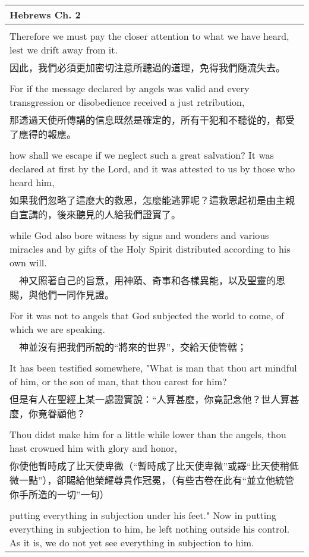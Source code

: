 \documentclass{book}
\begin{document}
\begin{tabularx}{\textwidth}{p{}}
\hline
Hebrews Ch. 2 \\
\hline \\
Therefore we must pay the closer attention to what we have heard, lest we drift away from it. \\
因此，我們必須更加密切注意所聽過的道理，免得我們隨流失去。 \\ \\
For if the message declared by angels was valid and every transgression or disobedience received a just retribution, \\
那透過天使所傳講的信息既然是確定的，所有干犯和不聽從的，都受了應得的報應。 \\ \\
how shall we escape if we neglect such a great salvation? It was declared at first by the Lord, and it was attested to us by those who heard him, \\
如果我們忽略了這麼大的救恩，怎麼能逃罪呢？這救恩起初是由主親自宣講的，後來聽見的人給我們證實了。 \\ \\
while God also bore witness by signs and wonders and various miracles and by gifts of the Holy Spirit distributed according to his own will. \\
　神又照著自己的旨意，用神蹟、奇事和各樣異能，以及聖靈的恩賜，與他們一同作見證。 \\ \\
For it was not to angels that God subjected the world to come, of which we are speaking. \\
　神並沒有把我們所說的“將來的世界”，交給天使管轄； \\ \\
It has been testified somewhere, "What is man that thou art mindful of him, or the son of man, that thou carest for him? \\
但是有人在聖經上某一處證實說：“人算甚麼，你竟記念他？世人算甚麼，你竟眷顧他？ \\ \\
Thou didst make him for a little while lower than the angels, thou hast crowned him with glory and honor, \\
你使他暫時成了比天使卑微（“暫時成了比天使卑微”或譯“比天使稍低微一點”），卻賜給他榮耀尊貴作冠冕，（有些古卷在此有“並立他統管你手所造的一切”一句） \\ \\
putting everything in subjection under his feet." Now in putting everything in subjection to him, he left nothing outside his control. As it is, we do not yet see everything in subjection to him. \\

\end{tabularx}
\end{document}
